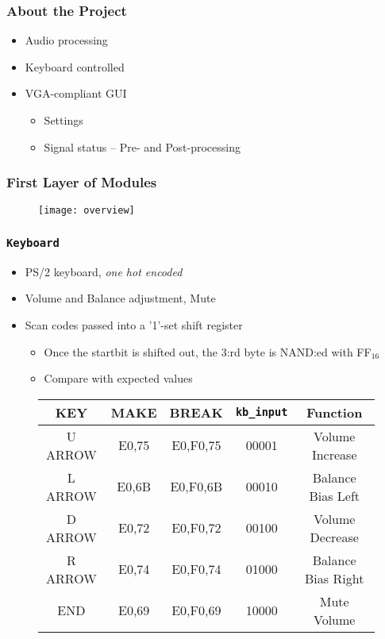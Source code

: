 \begin{frame}
  \frametitle{About the Project}
    \begin{itemize}
      \item Audio processing
      \item Keyboard controlled
      \item VGA-compliant GUI
        \begin{itemize}
          \item Settings
          \item Signal status -- Pre- and Post-processing
        \end{itemize}
    \end{itemize}
\end{frame}

\begin{frame}
  \frametitle{First Layer of Modules}
    \begin{figure}
      \centering
      \texttt{[image: overview]}
    \end{figure}
\end{frame}

\begin{frame}
  \frametitle{\texttt{Keyboard}}
    \begin{itemize}
      \item PS/2 keyboard, \emph{one hot encoded}
      \item Volume and Balance adjustment, Mute
      \item Scan codes passed into a '1'-set shift register
        \begin{itemize}
          \item Once the startbit is shifted out, the 3:rd byte is NAND:ed with FF$_{16}$
          \item Compare with expected values
        \end{itemize}
    \end{itemize}
    \begin{figure}
      \centering
      \begin{tabular}{|c|c|c|c|c|}
        \hline
        KEY & MAKE & BREAK & \texttt{kb\_input} & Function\\ \hline
        U ARROW & E0,75 & E0,F0,75 & 00001 & Volume Increase\\ \hline
        L ARROW & E0,6B & E0,F0,6B & 00010 & Balance Bias Left\\ \hline
        D ARROW & E0,72 & E0,F0,72 & 00100 & Volume Decrease\\ \hline
        R ARROW & E0,74 & E0,F0,74 & 01000 & Balance Bias Right\\ \hline
        END		& E0,69 & E0,F0,69 & 10000 & Mute Volume\\ \hline
      \end{tabular}
    \end{figure}
\end{frame}

